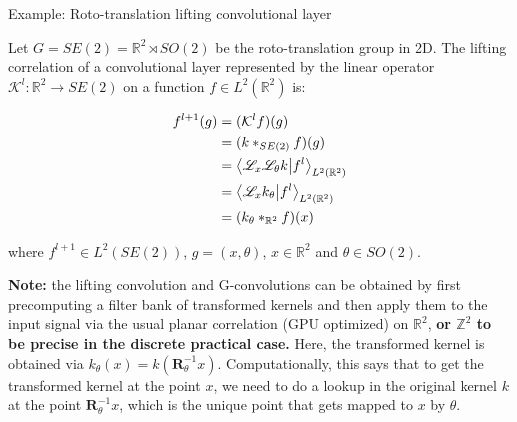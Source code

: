 \documentclass[9pt,dvipsnames]{beamer}
\begin{document}
\begin{frame}{Example: Roto-translation lifting convolutional layer}

	Let $G = SE(2) = \mathbb{R}^2 \rtimes SO(2)$ be the roto-translation group in 2D. The lifting correlation of a convolutional layer represented by the linear operator $\mathcal{K}^{l}: \mathbb{R}^2 \to SE(2)$ on a function $f \in L^2(\mathbb{R}^2)$ is:

	\begin{equation*}
		\begin{split}
			f^{l+1} (g) & = (\mathcal{K}^{l} f)(g)                                                   \\
			            & = (k *_{SE(2)} f)(g)                                                       \\
			            & = \braket{\mathscr{L}_x \mathscr{L}_{\theta} k}{f^{l}}_{L^2(\mathbb{R}^2)} \\
			            & = \braket{\mathscr{L}_x k_{\theta}}{f^{l}}_{L^2(\mathbb{R}^2)}             \\
			            & = (k_{\theta} *_{\mathbb{R}^2} f)(x)
		\end{split}
	\end{equation*}

	where $f^{l+1} \in L^2(SE(2))$, $g = (x, \theta)$, $x \in \mathbb{R}^2$ and $\theta \in SO(2)$.

	\sectionvspace

	\textbf{Note:} the lifting convolution and G-convolutions can be obtained by first precomputing a filter bank of transformed kernels and then apply them to the input signal via the usual planar correlation (GPU optimized) on $\mathbb{R}^2$, {\bf or $\mathbb{Z}^2$ to be precise in the discrete practical case.} Here, the transformed kernel is obtained via $k_\theta(x) = k(\mathbf{R}_{\theta}^{-1} x)$. Computationally, this says that to get the transformed kernel at the point $x$, we need to do a lookup in the original kernel $k$ at the point $\mathbf{R}_{\theta}^{-1} x$, which is the unique point that gets mapped to $x$ by $\theta$.

\end{frame}
\end{document}
